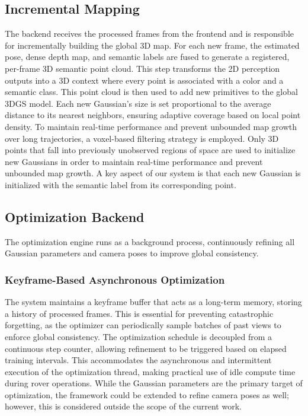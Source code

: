 \subsection{Incremental Mapping}
The backend receives the processed frames from the frontend and is responsible for incrementally building the global 3D map. For each new frame, the estimated pose, dense depth map, and semantic labels are fused to generate a registered, per-frame 3D semantic point cloud. This step transforms the 2D perception outputs into a 3D context where every point is associated with a color and a semantic class. This point cloud is then used to add new primitives to the global 3DGS model.
Each new Gaussian's size is set proportional to the average distance to its nearest neighbors, ensuring adaptive coverage based on local point density.
To maintain real-time performance and prevent unbounded map growth over long trajectories, a voxel-based filtering strategy is employed. Only 3D points that fall into previously unobserved regions of space are used to initialize new Gaussians in order to maintain real-time performance and prevent unbounded map growth. A key aspect of our system is that each new Gaussian is initialized with the semantic label from its corresponding point.

\subsection{Optimization Backend}
The optimization engine runs as a background process, continuously refining all Gaussian parameters and camera poses to improve global consistency.

\subsubsection{Keyframe-Based Asynchronous Optimization}
The system maintains a keyframe buffer that acts as a long-term memory, storing a history of processed frames. This is essential for preventing catastrophic forgetting, as the optimizer can periodically sample batches of past views to enforce global consistency. The optimization schedule is decoupled from a continuous step counter, allowing refinement to be triggered based on elapsed training intervals. This accommodates the asynchronous and intermittent execution of the optimization thread, making practical use of idle compute time during rover operations. While the Gaussian parameters are the primary target of optimization, the framework could be extended to refine camera poses as well; however, this is considered outside the scope of the current work.

